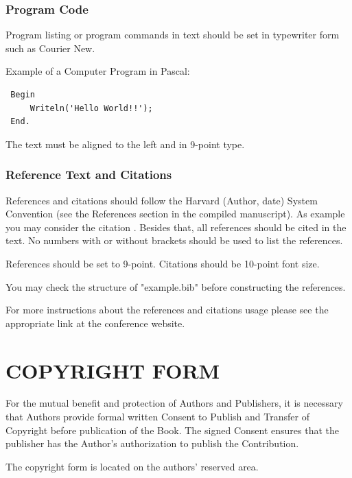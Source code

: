 \documentclass[a4paper,twoside]{article}
\begin{document}
\subsubsection{Program Code}\label{subsubsec:program_code}

Program listing or program commands in text should be set in
typewriter form such as Courier New.

Example of a Computer Program in Pascal:

\begin{small}
\begin{verbatim}
 Begin
     Writeln('Hello World!!');
 End.
\end{verbatim}
\end{small}


The text must be aligned to the left and in 9-point type.

\vfill
\subsubsection{Reference Text and Citations}

References and citations should follow the Harvard (Author, date)
System Convention (see the References section in the compiled
manuscript). As example you may consider the citation
\cite{Smith98}. Besides that, all references should be cited in the
text. No numbers with or without brackets should be used to list the
references.

References should be set to 9-point. Citations should be 10-point
font size.

You may check the structure of "example.bib" before constructing the
references.

For more instructions about the references and citations usage
please see the appropriate link at the conference website.

\section{\uppercase{Copyright Form}}

\noindent For the mutual benefit and protection of Authors and
Publishers, it is necessary that Authors provide formal written
Consent to Publish and Transfer of Copyright before publication of
the Book. The signed Consent ensures that the publisher has the
Author's authorization to publish the Contribution.

The copyright form is located on the authors' reserved area.
\end{document}
